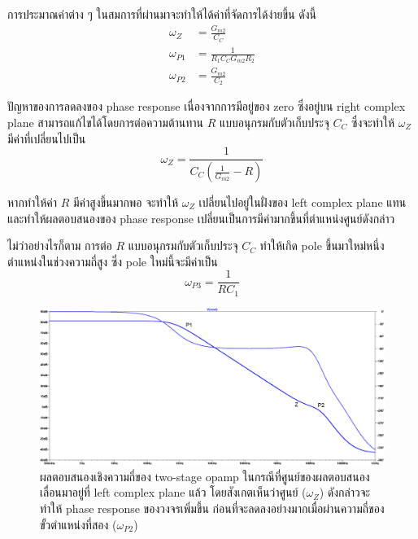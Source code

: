 \documentclass[a4paper, 11pt, oneside]{book} %
\begin{document}
การประมาณค่าต่าง ๆ ในสมการที่ผ่านมาจะทำให้ได้ค่าที่จัดการได้ง่ายขึ้น ดังนี้
\begin{subequations}
    \label{pole-zero-approx}
    \begin{align}
        \omega_{Z} &= \frac{G_{m2}}{C_{C}} \\
        \omega_{P1} &= \frac{1}{R_1C_CG_{m2}R_2} \\
        \omega_{P2} &= \frac{G_{m2}}{C_2}
    \end{align}
\end{subequations}

ปัญหาของการลดลงของ phase response เนื่องจากการมีอยู่ของ zero ซึ่งอยู่บน right complex plane สามารถแก้ไขได้โดยการต่อความต้านทาน $R$ แบบอนุกรมกับตัวเก็บประจุ $C_C$ ซึ่งจะทำให้ $\omega_{Z}$ มีค่าที่เปลี่ยนไปเป็น
\begin{equation}
    \omega_{Z} = \frac{1}{C_{C}(\frac{1}{G_{m2}} - R)}
    \label{new-zero}
\end{equation}

หากทำให้ค่า $R$ มีค่าสูงขึ้นมากพอ จะทำให้ $\omega_{Z}$ เปลี่ยนไปอยู่ในฝั่งของ left complex plane แทน และทำให้ผลตอบสนองของ phase response เปลี่ยนเป็นการมีค่ามากขึ้นที่ตำแหน่งศูนย์ดังกล่าว

ไม่ว่าอย่างไรก็ตาม การต่อ $R$ แบบอนุกรมกับตัวเก็บประจุ $C_C$ ทำให้เกิด pole ขึ้นมาใหม่หนึ่งตำแหน่งในช่วงความถี่สูง ซึ่ง pole ใหม่นี้จะมีค่าเป็น
\begin{equation}
    \omega_{P3} = \frac{1}{RC_{1}}
    \label{new-pole}
\end{equation}

\begin{figure}[h]
    \centering
    \includegraphics[width=\linewidth]{openloopgain_freqresponse}
    \caption{ผลตอบสนองเชิงความถี่ของ two-stage opamp ในกรณีที่ศูนย์ของผลตอบสนองเลื่อนมาอยู่ที่ left complex plane แล้ว โดยสังเกตเห็นว่าศูนย์ ($\omega_{Z}$) ดังกล่าวจะทำให้ phase response ของวงจรเพิ่มขึ้น ก่อนที่จะลดลงอย่างมากเมื่อผ่านความถี่ของขั้วตำแหน่งที่สอง ($\omega_{P2}$)}
    \label{openloopgain_freqresponse}
\end{figure}
\end{document}

